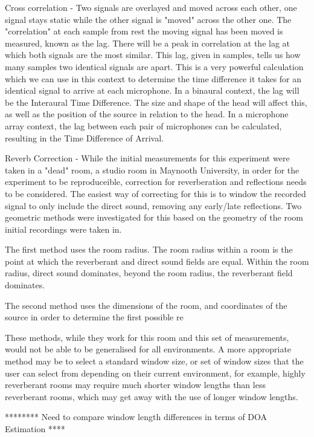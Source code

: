 Cross correlation - 
Two signals are overlayed and moved across each other, one signal stays
static while the other signal is "moved" across the other one. The "correlation" 
at each sample from rest the moving signal has been moved is measured, known as 
the lag. There will be a peak in correlation at the lag at which both signals 
are the most similar.
This lag, given in samples, tells us how many samples two identical signals are
apart. This is a very powerful calculation which we can use in this context to
determine the time difference it takes for an identical signal to arrive at each
microphone. 
In a binaural context, the lag will be the Interaural Time Difference. The size 
and shape of the head will affect this, as well as the position of the source in 
relation to the head.
In a microphone array context, the lag between each pair of microphones can be
calculated, resulting in the Time Difference of Arrival.


Reverb Correction - 
While the initial measurements for this experiment were taken in a "dead" room,
a studio room in Maynooth University, in order for the experiment to be reproduceible,
correction for reverberation and reflections needs to be considered.
The easiest way of correcting for this is to window the recorded signal to only
include the direct sound, removing any early/late reflections.
Two geometric methods were investigated for this based on the geometry of the room
initial recordings were taken in.

The first method uses the room radius. The room radius within a room is the 
point at which the reverberant and direct sound fields are equal. Within the
room radius, direct sound dominates, beyond the room radius, the reverberant
field dominates.

The second method uses the dimensions of the room, and coordinates of the
source in order to determine the first possible re

These methods, while they work for this room and this set of measurements, would 
not be able to be generalised for all environments. A more appropriate method may
be to select a standard window size, or set of window sizes that the user can 
select from depending on their current environment, for example, highly 
reverberant rooms may require much shorter window lengths than less reverberant 
rooms, which may get away with the use of longer window lengths.

******** Need to compare window length differences in terms of DOA Estimation ****